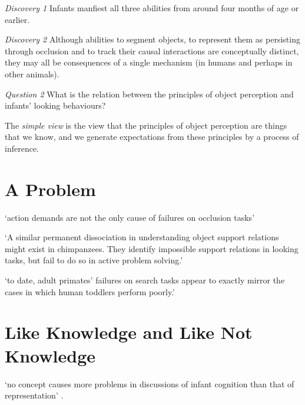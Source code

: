 \documentclass[12pt]{extarticle}
\begin{document}
\begin{multicols}{3}
\emph{Discovery 1} Infants manfiest all three abilities from around four months of age or earlier.
 
\emph{Discovery 2} Although abilities to segment objects, to represent them as persisting through occlusion and  to track their causal interactions are conceptually distinct, they may all be consequences of a single mechanism (in humans and perhaps in other animals).
 
\emph{Question 2} What is the relation between the principles of object perception and infants’ looking behaviours?
 
The \emph{simple view} is the view that the principles of object perception are things that we know, and we generate expectations from these principles by a process of inference.
 
 
 
\section{A Problem}
 
‘action demands are not the only cause of failures on occlusion tasks’
\citep[p.\ 291]{shinskey:2012_disappearing}
 
‘A similar permanent dissociation in understanding object support relations  
might exist in chimpanzees. They identify impossible support relations in looking tasks, 
but fail to do so in active problem solving.’
\citep{gomez:2005_species}
 
‘to date, adult primates’ failures on search tasks appear to 
exactly mirror the cases in which human toddlers perform poorly.’
\citep[p.\ 17]{santos:2009_object}
 
 
 
\section{Like Knowledge and Like Not Knowledge}
 
‘no concept causes more problems in discussions of infant cognition than that of representation’
\citep{Haith:1998aq}.
 
  

 
\footnotesize 


\end{multicols}
\end{document}
